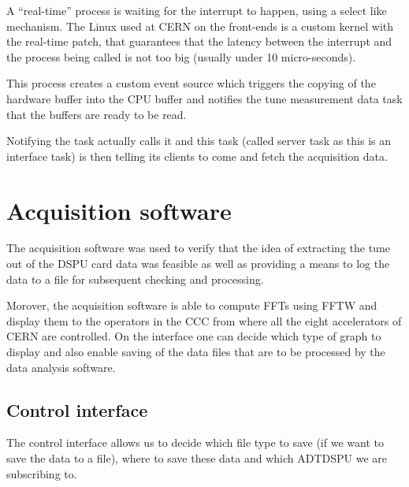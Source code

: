 A ``real-time'' process is waiting for the interrupt to happen, using a select like mechanism. The Linux used at \gls{CERN} on the front-ends is a custom kernel with the real-time patch, that guarantees that the latency between the interrupt and the process being called is not too big (usually under 10 micro-seconds).

This process creates a custom event source which triggers the copying of the hardware buffer into the \gls{CPU} buffer and notifies the tune measurement data task that the buffers are ready to be read.

Notifying the task actually calls it and this task (called server task as this is an interface task) is then telling its clients to come and fetch the acquisition data. 

\section{Acquisition software}

The acquisition software was used to verify that the idea of extracting the tune out of the DSPU card data was feasible as well as providing a means to log the data to a file for subsequent checking and processing.

Morover, the acquisition software is able to compute \glspl{FFT} using \gls{FFTW} and display them to the operators in the \gls{CCC} from where all the eight accelerators of \gls{CERN} are controlled. On the interface one can decide which type of graph to display and also enable saving of the data files that are to be processed by the data analysis software.

\subsection{Control interface}

The control interface allows us to decide which file type to save (if we want to save the data to a file), where to save these data and which ADTDSPU we are subscribing to.

